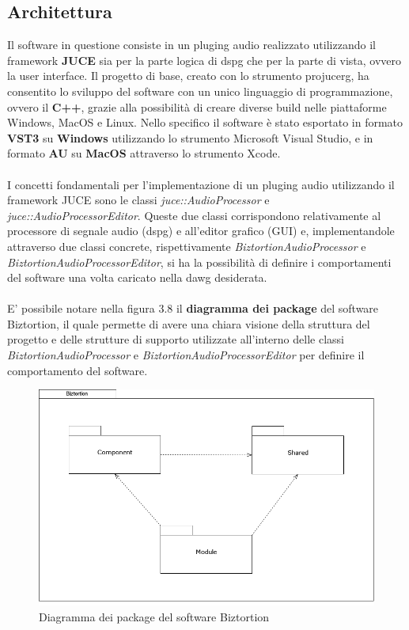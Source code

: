 \subsection{Architettura}
Il software in questione consiste in un \gls{pluging} audio realizzato utilizzando il framework \textbf{JUCE} sia per la parte logica di \gls{dspg} che per la parte di vista, ovvero la user interface. Il progetto di base, creato con lo strumento \gls{projucerg}, ha consentito lo sviluppo del software con un unico linguaggio di programmazione, ovvero il \textbf{C++}, grazie alla possibilità di creare diverse build nelle piattaforme Windows, MacOS e Linux. Nello specifico il software è stato esportato in formato \textbf{VST3} su \textbf{Windows} utilizzando lo strumento Microsoft Visual Studio, e in formato \textbf{AU} su \textbf{MacOS} attraverso lo strumento Xcode. \\ \\
I concetti fondamentali per l'implementazione di un \gls{pluging} audio utilizzando il framework JUCE sono le classi \textit{juce::AudioProcessor} e \textit{juce::AudioProcessorEditor}. Queste due classi corrispondono relativamente al processore di segnale audio (\gls{dspg}) e all'editor grafico (GUI) e, implementandole attraverso due classi concrete, rispettivamente \textit{BiztortionAudioProcessor} e \textit{BiztortionAudioProcessorEditor}, si ha la possibilità di definire i comportamenti del software una volta caricato nella \gls{dawg} desiderata. \\ \\
E' possibile notare nella figura 3.8 il \textbf{diagramma dei package} del software Biztortion, il quale permette di avere una chiara visione della struttura del progetto e delle strutture di supporto utilizzate all'interno delle classi \textit{BiztortionAudioProcessor} e \textit{BiztortionAudioProcessorEditor} per definire il comportamento del software.
\begin{figure}[h!] 
    \centering 
    \includegraphics[width=0.9\columnwidth]{immagini/cap3/package.png}
    \caption{Diagramma dei package del software Biztortion}
\end{figure} \\
